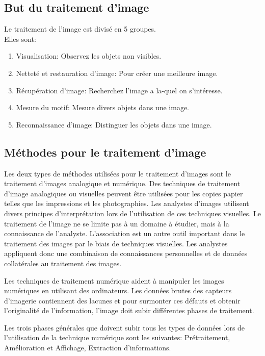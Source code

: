 \documentclass[12pt]{article}
\begin{document}
\subsection{But du traitement d'image}
Le traitement de l'image est divisé en 5 groupes.\\
Elles sont:
\begin{enumerate}
	\item Visualisation: Observez les objets non visibles.
	\item Netteté et restauration d'image: Pour créer une meilleure image.
	\item Récupération d'image: Recherchez l'image a la-quel on s’intéresse.
	\item Mesure du motif: Mesure divers objets dans une image.
	\item Reconnaissance d'image: Distinguer les objets dans une image.
\end{enumerate}
\subsection{Méthodes pour le traitement d’image}
Les deux types de méthodes utilisées pour le traitement d'images sont le traitement d'images analogique et numérique. Des techniques de traitement d'image analogiques ou visuelles peuvent être utilisées pour les copies papier telles que les impressions et les photographies. Les analystes d'images utilisent divers principes d'interprétation lors de l'utilisation de ces techniques visuelles. Le traitement de l'image ne se limite pas à un domaine à étudier, mais à la connaissance de l'analyste. L'association est un autre outil important dans le traitement des images par le biais de techniques visuelles. Les analystes appliquent donc une combinaison de connaissances personnelles et de données collatérales au traitement des images.

Les techniques de traitement numérique aident à manipuler les images numériques en utilisant des ordinateurs. Les données brutes des capteurs d'imagerie contiennent des lacunes et pour surmonter ces défauts et obtenir l’originalité de l’information, l’image doit subir différentes phases de traitement.

Les trois phases générales que doivent subir tous les types de données lors de l’utilisation de la technique numérique sont les suivantes: Prétraitement, Amélioration et Affichage, Extraction d’informations.
\end{document}
